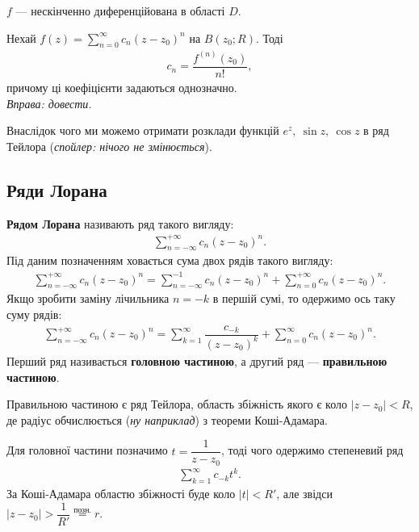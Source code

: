 \documentclass{math_library}
\begin{document}
\begin{corollary}
$f$ --- нескінченно диференційована в області $D$.
\end{corollary}

\begin{theorem}
Нехай $f(z) = \displaystyle\sum_{n=0}^\infty c_n (z-z_0)^n$ на $B(z_0;R)$. Тоді
\begin{align*}
c_n = \dfrac{f^{(n)}(z_0)}{n!},
\end{align*}
причому ці коефіцієнти задаються однозначно.\\
\textit{Вправа: довести.}
\end{theorem}

Внаслідок чого ми можемо отримати розклади функцій $e^z,\ \sin z,\ \cos z$ в ряд Тейлора (\textit{спойлер: нічого не змінюється}). 
\newpage

\subsection{Ряди Лорана}
\begin{definition}
\textbf{Рядом Лорана} називають ряд такого вигляду:
\begin{align*}
\sum_{n=-\infty}^{+\infty} c_n(z-z_0)^n.
\end{align*}
Під даним позначенням ховається сума двох рядів такого вигляду:
\begin{align*}
\sum_{n=-\infty}^{+\infty} c_n(z-z_0)^n = \sum_{n=-\infty}^{-1} c_n(z-z_0)^n + \sum_{n=0}^{+\infty} c_n(z-z_0)^n.
\end{align*}
Якщо зробити заміну лічильника $n = -k$ в першій сумі, то одержимо ось таку суму рядів:
\begin{align*}
\sum_{n=-\infty}^{+\infty} c_n(z-z_0)^n = \sum_{k=1}^\infty \dfrac{c_{-k}}{(z-z_0)^k} + \sum_{n=0}^\infty c_n(z-z_0)^n.
\end{align*}
Перший ряд називається \textbf{головною частиною}, а другий ряд --- \textbf{правильною частиною}.
\end{definition}

\begin{remark}
Правильною частиною є ряд Тейлора, область збіжність якого є коло $|z-z_0| < R$, де радіус обчислюється (\textit{ну наприклад}) з теореми Коші-Адамара.
\end{remark}

\begin{remark}
Для головної частини позначимо $t = \dfrac{1}{z-z_0}$, тоді чого одержимо степеневий ряд
\begin{align*}
\sum_{k=1}^\infty c_{-k} t^k.
\end{align*}
За Коші-Адамара областю збіжності буде коло $|t| < R'$, але звідси $|z-z_0| > \dfrac{1}{R'} \overset{\text{позн.}}{=} r$.
\end{remark}
\end{document}
